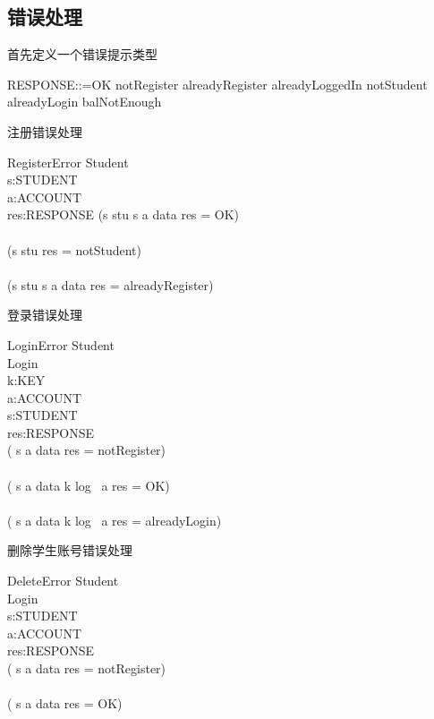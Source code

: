 \documentclass{article}
\begin{document}
\begin{CJK}{UTF8}{gbsn}
\begin{spacing}{1.4}
\section{错误处理}
首先定义一个错误提示类型
\begin{zed}
RESPONSE::=OK \mid notRegister \mid alreadyRegister \mid alreadyLoggedIn  \mid notStudent \mid alreadyLogin \mid balNotEnough
\end{zed}
注册错误处理
\begin{schema}{RegisterError}
\Xi Student\\
s:STUDENT\\
a:ACCOUNT\\
res:RESPONSE
\where
(s \in stu \land  s \mapsto a \notin data \land res = OK)\\
\lor\\
(s \notin stu \land res = notStudent)\\
\lor\\
(s \in stu \land  s \mapsto a \in data \land res = alreadyRegister)

\end{schema}
登录错误处理
\begin{schema}{LoginError}
\Xi Student\\
\Xi Login\\
k:KEY\\
a:ACCOUNT\\
s:STUDENT\\
res:RESPONSE\\
\where
( s \mapsto a \notin data \land res = notRegister)\\
\lor\\
( s \mapsto a \in data \land k \notin log \ a \land res = OK)\\
\lor\\
( s \mapsto a \in data \land k \in log \ a \land res = alreadyLogin)

\end{schema}
删除学生账号错误处理
\begin{schema}{DeleteError}
\Xi Student\\
\Xi Login\\
s:STUDENT\\
a:ACCOUNT\\
res:RESPONSE\\
\where
( s \mapsto a \notin data \land res = notRegister)\\
\lor\\
( s \mapsto a \in data  \land res = OK)\\


\end{schema}
\end{spacing}
\end{CJK}
\end{document}
